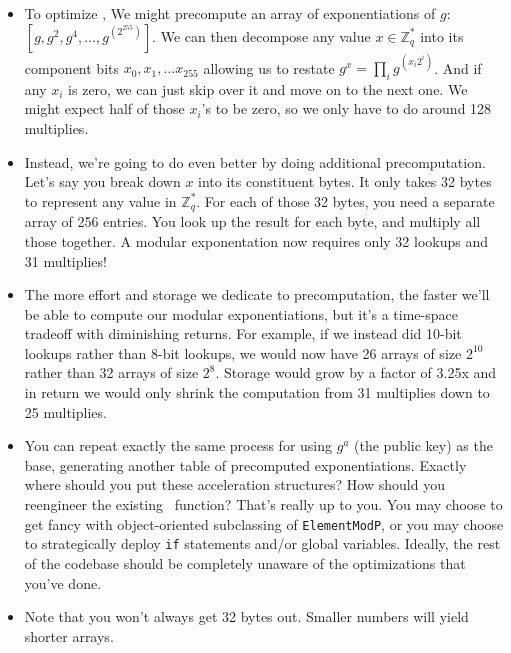 \begin{itemize}
\item To optimize , We might
  precompute an array of exponentiations of $g$: $\left[g, g^2, g^4, \ldots,
    g^{\left(2^{255}\right)}\right]$.
  We can then decompose any value $x \in \mathbb{Z}_q^*$
  into its component bits $x_{0},x_{1},\ldots x_{255}$
  allowing us to restate $g^x = \prod_i g^{\left(x_i 2^i\right)}$. And if
  any $x_i$ is zero, we can just skip over it and move on to the next one.
  We might expect half of those $x_i$'s to be zero, so we only have to
  do around 128 multiplies.

\item Instead, we're going to do even better by doing additional
  precomputation. Let's say you break down $x$ into its constituent bytes.
  It only takes 32 bytes to represent any value in $\mathbb{Z}_q^*$.
  For each of those 32 bytes, you need a separate array of 256 entries.
  You look up the result for each byte, and multiply all those together.
  A modular exponentation now requires only 32 lookups and 31 multiplies!

\item The more effort and storage we dedicate to precomputation, the
  faster we'll be able to compute our modular exponentiations, but
  it's a time-space tradeoff with diminishing returns. For example, if
  we instead did 10-bit lookups rather than 8-bit lookups, we would
  now have 26 arrays of size $2^{10}$ rather than 32 arrays of size
  $2^8$. Storage would grow by a factor of 3.25x and in return we
  would only shrink the computation from 31 multiplies down to 25
  multiplies.
  
\item You can repeat exactly the same process for using $g^a$ (the public
  key) as the base, generating another table of precomputed
  exponentiations. Exactly where should you put these acceleration
  structures? How should you reengineer the existing \ function?
  That's really up to you. You may choose to get fancy with
  object-oriented subclassing of {\tt ElementModP}, or you may choose
  to strategically deploy {\tt if} statements and/or global variables.
  Ideally, the rest of the codebase should be completely unaware of
  the optimizations that you've done.

\item {}
      Note that you won't always get 32 bytes out. Smaller numbers
      will yield shorter arrays.


\end{itemize}
